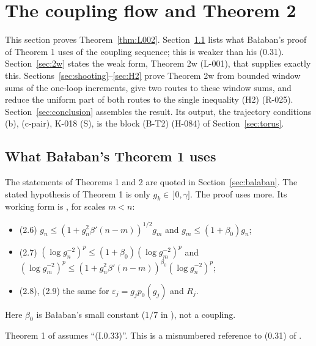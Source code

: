 \section{The coupling flow and Theorem 2}\label{sec:flow}

This section proves Theorem~\ref{thm:L002}. Section~\ref{sec:needs} lists what Ba{\l}aban's proof of Theorem 1 uses of the coupling sequence; this is weaker than his (0.31). Section~\ref{sec:2w} states the weak form, Theorem 2w (L-001), that supplies exactly this. Sections~\ref{sec:shooting}--\ref{sec:H2} prove Theorem 2w from bounded window sums of the one-loop increments, give two routes to these window sums, and reduce the uniform part of both routes to the single inequality (H2) (R-025). Section~\ref{sec:conclusion} assembles the result. Its output, the trajectory conditions (b), (c-pair), K-018 (S), is the block (B-T2) (H-084) of Section~\ref{sec:torus}.

\subsection{What Ba{\l}aban's Theorem 1 uses}\label{sec:needs}

The statements of Theorems 1 and 2 are quoted in Section~\ref{sec:balaban}. The stated hypothesis of Theorem 1 is only $g_k\in\,]0,\gamma]$. The proof uses more. Its working form is \cite[pp.~255--256, (2.6)--(2.9)]{balaban119}, for scales $m<n$:
\begin{itemize}
\item (2.6) $g_n \le (1 + g_n^2\beta'(n-m))^{1/2} g_m$ and $g_m \le (1+\beta_0) g_n$;
\item (2.7) $(\log g_n^{-2})^p \le (1+\beta_0)(\log g_m^{-2})^p$ and $(\log g_m^{-2})^p \le (1 + g_n^2\beta'(n-m))^{\beta_0}(\log g_n^{-2})^p$;
\item (2.8), (2.9) the same for $\varepsilon_j = g_j p_0(g_j)$ and $R_j$.
\end{itemize}
Here $\beta_0$ is Ba{\l}aban's small constant ($1/7$ in \cite[p.~389]{balaban122b}), not a coupling.

\begin{remark}
Theorem 1 of \cite[p.~262]{balaban119} assumes ``(I.0.33)''. This is a misnumbered reference to (0.31) of \cite{balaban109}.
\end{remark}

